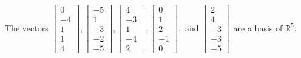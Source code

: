 \begin{exercise}
\begin{exerciseStatement}
  \end{exerciseStatement}
  \begin{exerciseAnswer}
   The vectors \(\left[\begin{array}{r}
0 \\
-4 \\
1 \\
1 \\
4
\end{array}\right] , \left[\begin{array}{r}
-5 \\
1 \\
-3 \\
-2 \\
-5
\end{array}\right] , \left[\begin{array}{r}
4 \\
-3 \\
1 \\
-4 \\
2
\end{array}\right] , \left[\begin{array}{r}
0 \\
1 \\
2 \\
-1 \\
0
\end{array}\right] , \text{ and } \left[\begin{array}{r}
2 \\
4 \\
-3 \\
-3 \\
-5
\end{array}\right]\) 
  	 are  a basis of \(\mathbb{R}^5\).
  


  \end{exerciseAnswer}
\end{exercise}